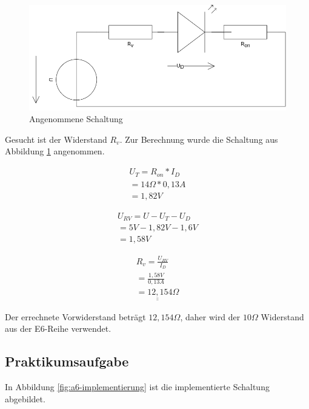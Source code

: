 \begin{figure}[h]
    \centering
    \includegraphics[height=0.3\textheight]{pictures/a7-rechnung-vorwiderstand.png}
    \caption{Angenommene Schaltung}
    \label{fig:a7-angenommene-schaltung}
\end{figure}

Gesucht ist der Widerstand $R_v$.
Zur Berechnung wurde die Schaltung aus Abbildung \ref{fig:a7-angenommene-schaltung} angenommen.

\begin{align}
    U_T = R_{on} * I_D \\
    = 14\Omega * 0,13A \\
    = 1,82V
\end{align}

\begin{align}
    U_{RV} = U - U_T - U_D \\
    = 5V - 1,82V - 1,6V \\
    = 1,58V
\end{align}

\begin{align}
    R_v = \frac{U_{RV}}{I_D} \\
    = \frac{1,58V}{0,13A} \\
    \underline{\underline{= 12,154\Omega}}
\end{align}

Der errechnete Vorwiderstand beträgt $12,154\Omega$, daher wird der $10\Omega$ Widerstand aus der E6-Reihe verwendet.

\subsection{Praktikumsaufgabe}
\label{subsec:a7-praktikumsaufgabe}

In Abbildung \ref{fig:a6-implementierung} ist die implementierte Schaltung abgebildet.


